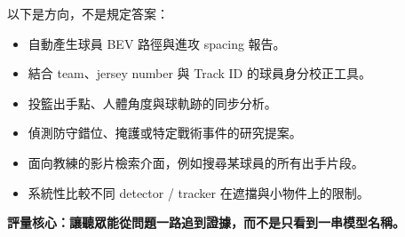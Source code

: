 \documentclass[11pt]{article}
\begin{document}
以下是方向，不是規定答案：

\begin{itemize}[leftmargin=1.6em,itemsep=3pt]
  \item 自動產生球員 BEV 路徑與進攻 spacing 報告。
  \item 結合 team、jersey number 與 Track ID 的球員身分校正工具。
  \item 投籃出手點、人體角度與球軌跡的同步分析。
  \item 偵測防守錯位、掩護或特定戰術事件的研究提案。
  \item 面向教練的影片檢索介面，例如搜尋某球員的所有出手片段。
  \item 系統性比較不同 detector / tracker 在遮擋與小物件上的限制。
\end{itemize}

\vfill
\begin{center}
\small\textbf{評量核心：讓聽眾能從問題一路追到證據，而不是只看到一串模型名稱。}
\end{center}
\end{document}
